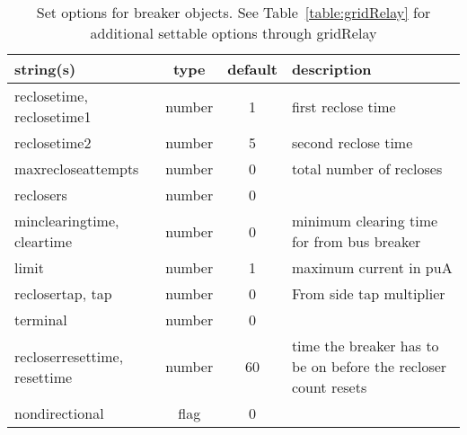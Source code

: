 \begin{table}[ht]
\centering
\begin{tabular}{p{5cm} c c p{7cm}}
\hline
string(s) & type & default & description \\
\hline
reclosetime, reclosetime1 & number & 1 & first reclose time\\
reclosetime2 & number & 5 & second reclose time\\
maxrecloseattempts & number & 0 & total number of recloses\\
reclosers & number & 0 & \\
minclearingtime, cleartime & number & 0 & minimum clearing time for from bus breaker\\
limit & number & 1 & maximum current in puA\\
reclosertap, tap & number & 0 & From side tap multiplier\\
terminal & number & 0 & \\
recloserresettime, resettime & number & 60 & time the breaker has to be on before the recloser count resets\\
nondirectional & flag & 0 & \\
\hline
\end{tabular}
\caption{Set options for breaker objects. See Table~\ref{table:gridRelay} for additional settable options through gridRelay}
\label{table:breaker}
\end{table}

